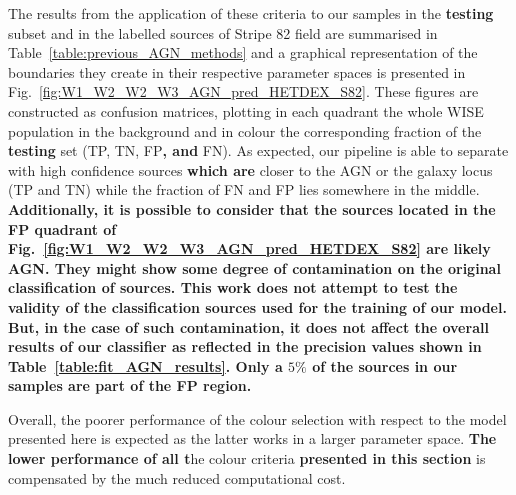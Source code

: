 \documentclass{aa}
\begin{document}
The results from the application of these criteria to our samples in the \textbf{testing} subset and in the labelled sources of Stripe 82 field are summarised in Table~\ref{table:previous_AGN_methods} and a graphical representation of the boundaries they create in their respective parameter spaces is presented in Fig.~\ref{fig:W1_W2_W2_W3_AGN_pred_HETDEX_S82}. These figures are constructed as confusion matrices, plotting in each quadrant the whole WISE population in the background and in colour the corresponding fraction of the \textbf{testing} set (TP, TN, FP\textbf{, and} FN). As expected, our pipeline is able to separate with high confidence sources \textbf{which are} closer to the AGN or the galaxy locus (TP and TN) while the fraction of FN and FP lies somewhere in the middle. \textbf{Additionally, it is possible to consider that the sources located in the FP quadrant of Fig.~\ref{fig:W1_W2_W2_W3_AGN_pred_HETDEX_S82} are likely AGN. They might show some degree of contamination on the original classification of sources. This work does not attempt to test the validity of the classification sources used for the training of our model. But, in the case of such contamination, it does not affect the overall results of our classifier as reflected in the precision values shown in Table~\ref{table:fit_AGN_results}. Only a $5\%$ of the sources in our samples are part of the FP region.}

Overall, the poorer performance of the colour selection with respect to the model presented here is expected as the latter works in a larger parameter space. \textbf{The lower performance of all t}he colour criteria \textbf{presented in this section} is compensated by the much reduced computational cost.
\end{document}

